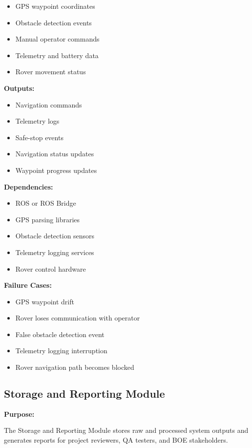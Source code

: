 \documentclass{article}
\begin{document}
\begin{itemize}
    \item GPS waypoint coordinates
    \item Obstacle detection events
    \item Manual operator commands
    \item Telemetry and battery data
    \item Rover movement status
\end{itemize}

\textbf{Outputs:}

\begin{itemize}
    \item Navigation commands
    \item Telemetry logs
    \item Safe-stop events
    \item Navigation status updates
    \item Waypoint progress updates
\end{itemize}

\textbf{Dependencies:}

\begin{itemize}
    \item ROS or ROS Bridge
    \item GPS parsing libraries
    \item Obstacle detection sensors
    \item Telemetry logging services
    \item Rover control hardware
\end{itemize}

\textbf{Failure Cases:}

\begin{itemize}
    \item GPS waypoint drift
    \item Rover loses communication with operator
    \item False obstacle detection event
    \item Telemetry logging interruption
    \item Rover navigation path becomes blocked
\end{itemize}

\subsection{Storage and Reporting Module}

\textbf{Purpose:}

The Storage and Reporting Module stores raw and processed system outputs and generates reports for project reviewers, QA testers, and BOE stakeholders.
\end{document}
